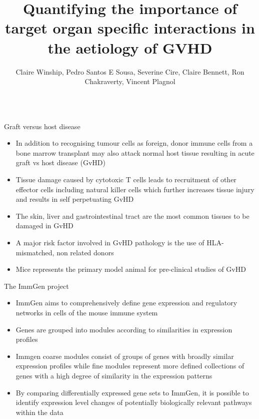 \documentclass[final,hyperref={pdfpagelabels=false}]{beamer}
\title[GVHD]{Quantifying the importance of target organ specific interactions in the aetiology of GVHD}
\author[a]{Claire Winship, Pedro Santos E Sousa, Severine Cire, Claire Bennett, Ron Chakraverty, Vincent Plagnol}
\institute[ugi]{UCL Genetics Institute}
\begin{document}
\begin{frame}{} 



\vfill
\begin{columns}[t]

  \begin{column}{.26\linewidth}
    \begin{block}{Graft versus host disease}
{\small  \begin{itemize}
      \item In addition to recognising tumour cells as foreign, donor immune cells from a bone marrow transplant may also attack normal host tissue resulting in acute graft vs host disease (GvHD)
  \item Tissue damage caused by cytotoxic T cells leads to recruitment of other effector cells including natural killer cells which further increases tissue injury and results in self perpetuating GvHD
      \item The skin, liver and gastrointestinal tract are the most common tissues to be damaged in GvHD
  \item A major risk factor involved in GvHD pathology is the use of HLA-mismatched, non related donors
      \item Mice represents the primary model animal for pre-clinical studies of GvHD
      \end{itemize}} 
    \end{block}

    \begin{block}{The ImmGen project}
 {\small     \begin{itemize}
      \item ImmGen aims to comprehensively define gene expression and regulatory networks in cells of the mouse immune system
      \item Genes are grouped into modules according to similarities in expression profiles 
      \item Immgen coarse modules consist of groups of genes with broadly similar expression profiles while fine modules represent more defined collections of genes with a high degree of similarity in the expression patterns
  \item By comparing differentially expressed gene sets to ImmGen, it is possible to identify expression level changes of potentially biologically relevant pathways within the data
      \end{itemize}}
    \end{block}


\end{column}
\end{columns}
\end{frame}
\end{document}
